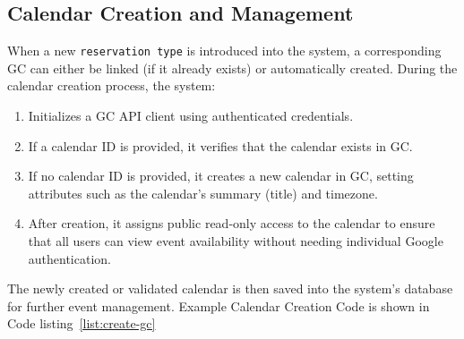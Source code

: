 \subsection{Calendar Creation and Management}

When a new \texttt{reservation type} is introduced into the system, a corresponding GC can either be linked (if it already exists) or automatically created. During the calendar creation process, the system:

\begin{enumerate}
\item Initializes a GC API client using authenticated credentials.
\item If a calendar ID is provided, it verifies that the calendar exists in GC.
\item If no calendar ID is provided, it creates a new calendar in GC, setting attributes such as the calendar’s summary (title) and timezone.
\item After creation, it assigns public read-only access to the calendar to ensure that all users can view event availability without needing individual Google authentication.
\end{enumerate}

The newly created or validated calendar is then saved into the system’s database for further event management. Example Calendar Creation Code is shown in Code listing~\ref{list:create-gc}

